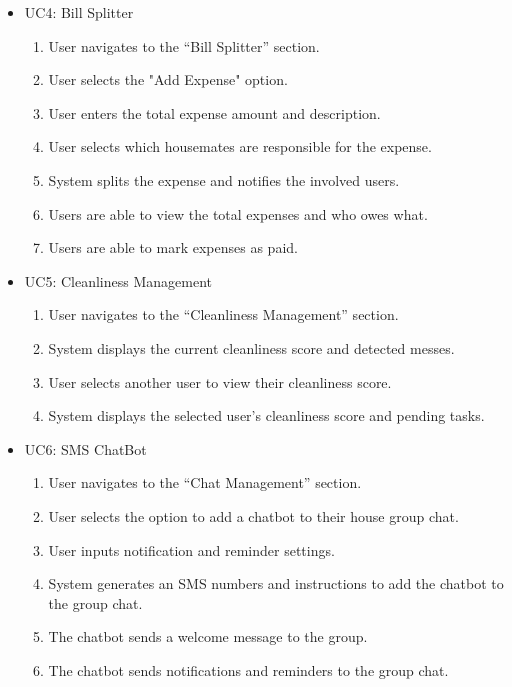 \documentclass{scrreprt}
\theoremstyle{definition}
\begin{document}
\begin{itemize}
    \item UC4: Bill Splitter
    \begin{enumerate}
        \item User navigates to the “Bill Splitter” section.
        \item User selects the "Add Expense" option.
        \item User enters the total expense amount and description.
        \item User selects which housemates are responsible for the expense.
        \item System splits the expense and notifies the involved users.
        \item Users are able to view the total expenses and who owes what.
        \item Users are able to mark expenses as paid.
    \end{enumerate}
    
    \item UC5: Cleanliness Management
    \begin{enumerate}
        \item User navigates to the “Cleanliness Management” section.
        \item System displays the current cleanliness score and detected messes.
        \item User selects another user to view their cleanliness score.
        \item System displays the selected user’s cleanliness score and pending tasks.
    \end{enumerate}
    
    \item UC6: SMS ChatBot
    \begin{enumerate}
        \item User navigates to the “Chat Management” section.
        \item User selects the option to add a chatbot to their house group chat.
        \item User inputs notification and reminder settings.
        \item System generates an SMS numbers and instructions to add the chatbot to the group chat.
        \item The chatbot sends a welcome message to the group.
        \item The chatbot sends notifications and reminders to the group chat.
    \end{enumerate}
    
\end{itemize}
    
\end{document}
